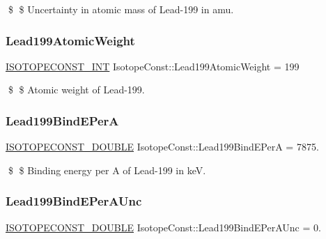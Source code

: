 \$ \$ Uncertainty in atomic mass of Lead-\/199 in amu. \mbox{\label{group___isotope_const-_lead-_pb199_ga126a5a61ed141eac04c209154b86bfd4}} 
\subsubsection{\texorpdfstring{Lead199\+Atomic\+Weight}{Lead199AtomicWeight}}
{\footnotesize\ttfamily \mbox{\hyperlink{group___isotope_const-_macros_ga5f18360b3e99483a35c32d789e62621c}{I\+S\+O\+T\+O\+P\+E\+C\+O\+N\+S\+T\+\_\+\+I\+NT}} Isotope\+Const\+::\+Lead199\+Atomic\+Weight = 199}

\$ \$ Atomic weight of Lead-\/199. \mbox{\label{group___isotope_const-_lead-_pb199_gaa240d0696d7ac8316b3f4bb4ccdb9cfb}} 
\subsubsection{\texorpdfstring{Lead199\+Bind\+E\+PerA}{Lead199BindEPerA}}
{\footnotesize\ttfamily \mbox{\hyperlink{group___isotope_const-_macros_ga8f45a7272ce02c0b4c65c44636ed719a}{I\+S\+O\+T\+O\+P\+E\+C\+O\+N\+S\+T\+\_\+\+D\+O\+U\+B\+LE}} Isotope\+Const\+::\+Lead199\+Bind\+E\+PerA = 7875.}

\$ \$ Binding energy per A of Lead-\/199 in keV. \mbox{\label{group___isotope_const-_lead-_pb199_gaa9bcebcf2db0de925f140d9b5236a11d}} 
\subsubsection{\texorpdfstring{Lead199\+Bind\+E\+Per\+A\+Unc}{Lead199BindEPerAUnc}}
{\footnotesize\ttfamily \mbox{\hyperlink{group___isotope_const-_macros_ga8f45a7272ce02c0b4c65c44636ed719a}{I\+S\+O\+T\+O\+P\+E\+C\+O\+N\+S\+T\+\_\+\+D\+O\+U\+B\+LE}} Isotope\+Const\+::\+Lead199\+Bind\+E\+Per\+A\+Unc = 0.}

